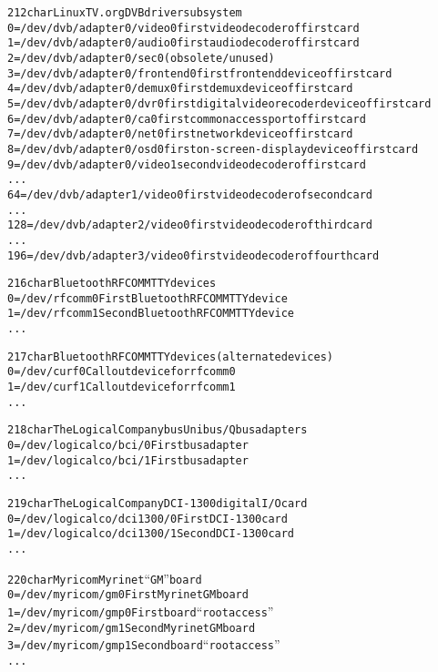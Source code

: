 \documentclass[a4paper,8pt,english]{sphinxmanual}
\begin{document}
\begin{alltt}
 212 char       LinuxTV.org DVB driver subsystem
                  0 = /dev/dvb/adapter0/video0    first video decoder of first card
                  1 = /dev/dvb/adapter0/audio0    first audio decoder of first card
                  2 = /dev/dvb/adapter0/sec0      (obsolete/unused)
                  3 = /dev/dvb/adapter0/frontend0 first frontend device of first card
                  4 = /dev/dvb/adapter0/demux0    first demux device of first card
                  5 = /dev/dvb/adapter0/dvr0      first digital video recoder device of first card
                  6 = /dev/dvb/adapter0/ca0       first common access port of first card
                  7 = /dev/dvb/adapter0/net0      first network device of first card
                  8 = /dev/dvb/adapter0/osd0      first on-screen-display device of first card
                  9 = /dev/dvb/adapter0/video1    second video decoder of first card
                    ...
                 64 = /dev/dvb/adapter1/video0    first video decoder of second card
                    ...
                128 = /dev/dvb/adapter2/video0    first video decoder of third card
                    ...
                196 = /dev/dvb/adapter3/video0    first video decoder of fourth card

 216 char       Bluetooth RFCOMM TTY devices
                  0 = /dev/rfcomm0              First Bluetooth RFCOMM TTY device
                  1 = /dev/rfcomm1              Second Bluetooth RFCOMM TTY device
                    ...

 217 char       Bluetooth RFCOMM TTY devices (alternate devices)
                  0 = /dev/curf0                Callout device for rfcomm0
                  1 = /dev/curf1                Callout device for rfcomm1
                    ...

 218 char       The Logical Company bus Unibus/Qbus adapters
                  0 = /dev/logicalco/bci/0      First bus adapter
                  1 = /dev/logicalco/bci/1      First bus adapter
                    ...

 219 char       The Logical Company DCI-1300 digital I/O card
                  0 = /dev/logicalco/dci1300/0  First DCI-1300 card
                  1 = /dev/logicalco/dci1300/1  Second DCI-1300 card
                    ...

 220 char       Myricom Myrinet ``GM'' board
                  0 = /dev/myricom/gm0          First Myrinet GM board
                  1 = /dev/myricom/gmp0         First board ``root access''
                  2 = /dev/myricom/gm1          Second Myrinet GM board
                  3 = /dev/myricom/gmp1         Second board ``root access''
                    ...


\end{alltt}
\end{document}
